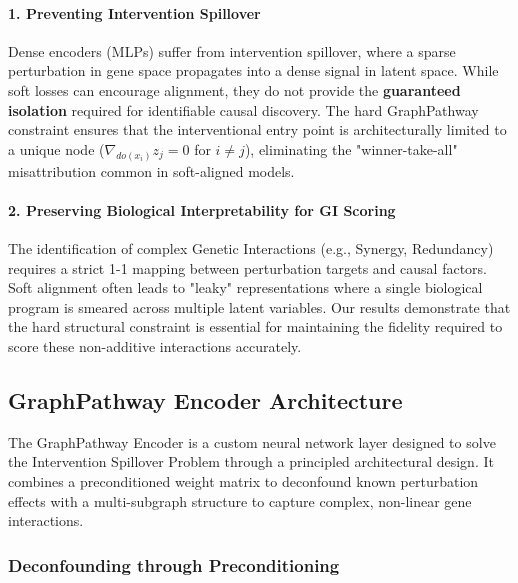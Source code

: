 \paragraph{1. Preventing Intervention Spillover}
Dense encoders (MLPs) suffer from intervention spillover, where a sparse perturbation in gene space propagates into a dense signal in latent space. While soft losses can encourage alignment, they do not provide the \textbf{guaranteed isolation} required for identifiable causal discovery. The hard GraphPathway constraint ensures that the interventional entry point is architecturally limited to a unique node ($\nabla_{do(x_i)} z_j = 0$ for $i \neq j$), eliminating the "winner-take-all" misattribution common in soft-aligned models.

\paragraph{2. Preserving Biological Interpretability for GI Scoring}
The identification of complex Genetic Interactions (e.g., Synergy, Redundancy) requires a strict 1-1 mapping between perturbation targets and causal factors. Soft alignment often leads to "leaky" representations where a single biological program is smeared across multiple latent variables. Our results demonstrate that the hard structural constraint is essential for maintaining the fidelity required to score these non-additive interactions accurately.

\subsection{GraphPathway Encoder Architecture}
\label{app:graphpathway}

The GraphPathway Encoder is a custom neural network layer designed to solve the Intervention Spillover Problem through a principled architectural design.
It combines a preconditioned weight matrix to deconfound known perturbation effects with a multi-subgraph structure to capture complex, non-linear gene interactions.

\subsubsection{Deconfounding through Preconditioning}
\label{app:graphpathway:preconditioning}

